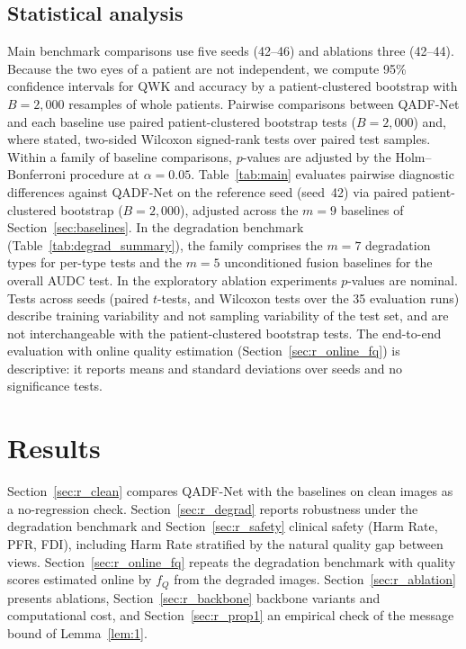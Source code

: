 \documentclass[final,5p,times,twocolumn,authoryear]{elsarticle}
\newcommand{\qadfnet}{QADF-Net}
\theoremstyle{plain}
\theoremstyle{remark}
\begin{document}
\subsection{Statistical analysis}
\label{sec:stats}

Main benchmark comparisons use five seeds (42--46) and ablations three (42--44). Because the two eyes of a patient are not independent, we compute 95\% confidence intervals for QWK and accuracy by a patient-clustered bootstrap \citep{Cameron2015clustboot} with $B=2{,}000$ resamples of whole patients. Pairwise comparisons between \qadfnet{} and each baseline use paired patient-clustered bootstrap tests ($B=2{,}000$) and, where stated, two-sided Wilcoxon signed-rank tests \citep{Wilcoxon1945} over paired test samples. Within a family of baseline comparisons, $p$-values are adjusted by the Holm--Bonferroni procedure \citep{Holm1979} at $\alpha = 0.05$. Table~\ref{tab:main} evaluates pairwise diagnostic differences against \qadfnet{} on the reference seed (seed~42) via paired patient-clustered bootstrap ($B=2{,}000$), adjusted across the $m=9$ baselines of Section~\ref{sec:baselines}. In the degradation benchmark (Table~\ref{tab:degrad_summary}), the family comprises the $m=7$ degradation types for per-type tests and the $m=5$ unconditioned fusion baselines for the overall AUDC test. In the exploratory ablation experiments $p$-values are nominal. Tests across seeds (paired $t$-tests, and Wilcoxon tests over the 35 evaluation runs) describe training variability and not sampling variability of the test set, and are not interchangeable with the patient-clustered bootstrap tests. The end-to-end evaluation with online quality estimation (Section~\ref{sec:r_online_fq}) is descriptive: it reports means and standard deviations over seeds and no significance tests.

\section{Results}
\label{sec:results}

Section~\ref{sec:r_clean} compares \qadfnet{} with the baselines on clean images as a no-regression check. Section~\ref{sec:r_degrad} reports robustness under the degradation benchmark and Section~\ref{sec:r_safety} clinical safety (Harm Rate, PFR, FDI), including Harm Rate stratified by the natural quality gap between views. Section~\ref{sec:r_online_fq} repeats the degradation benchmark with quality scores estimated online by $f_Q$ from the degraded images. Section~\ref{sec:r_ablation} presents ablations, Section~\ref{sec:r_backbone} backbone variants and computational cost, and Section~\ref{sec:r_prop1} an empirical check of the message bound of Lemma~\ref{lem:1}.
\end{document}

